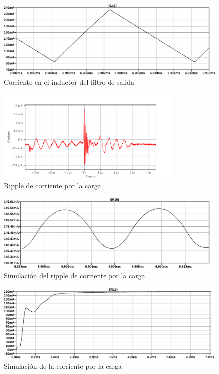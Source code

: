 \begin{figure}[H]
    \centering
    \includegraphics[width=\textwidth]{images/sim/13.pdf}
    \caption{Corriente en el inductor del filtro de salida}
    \label{fig:sim:13}
\end{figure}



\begin{figure}[H]
    \centering
    \includegraphics[width=0.8\textwidth]{images/capturas-osciloscopio/17-11-2022/67.png}
    \caption{Ripple de corriente por la carga}
    \label{fig:osc:67}
\end{figure}

\begin{figure}[H]
    \centering
    \includegraphics[width=\textwidth]{images/sim/14-ripple.pdf}
    \caption{Simulación del ripple de corriente por la carga}
    \label{fig:sim:14ripple}
\end{figure}

\begin{figure}[H]
    \centering
    \includegraphics[width=\textwidth]{images/sim/14.pdf}
    \caption{Simulación de la corriente por la carga}
    \label{fig:sim:14}
\end{figure}

